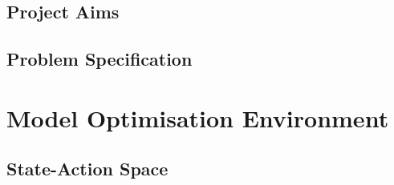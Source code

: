 \section{Project Aims}

\section{Problem Specification}

\chapter{Model Optimisation Environment}

\section{State-Action Space}